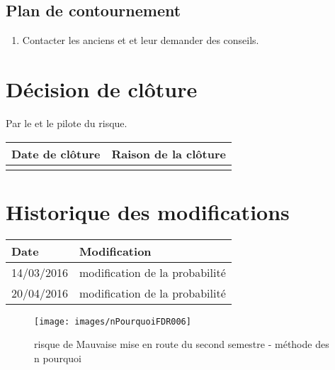 \flushleft
\subsection*{Plan de contournement}

\begin{enumerate}
	\item Contacter les anciens \CP{} et \RQ{} et leur demander des conseils.
\end{enumerate}

\section*{Décision de clôture}
Par le \CP{} et le pilote du risque.
\begin{table}[H]
\centering
	\begin{tabularx}{16.8cm}{|X|X|}
	\hline
	\rowcolor{gray!40} Date de clôture & Raison de la clôture \\
	\hline
	  & \\
	\hline
	\end{tabularx}
\end{table}

\section*{Historique des modifications}
\begin{table}[H]
\centering
	\begin{tabularx}{16.8cm}{|X|X|}
	\hline
	Date & Modification \\
	\hline
	 14/03/2016 & modification de la probabilité \\
	\hline
	 20/04/2016 & modification de la probabilité \\
	\hline
	
	\end{tabularx}
\end{table}
\newpage

\begin{landscape}
\begin{figure}
	\centering
	\texttt{[image: images/nPourquoiFDR006]}
	\caption{\label{risque Mauvaise mise en route du second semestre}risque de Mauvaise mise en route du second semestre - méthode des n pourquoi}
\end{figure}
\end{landscape}